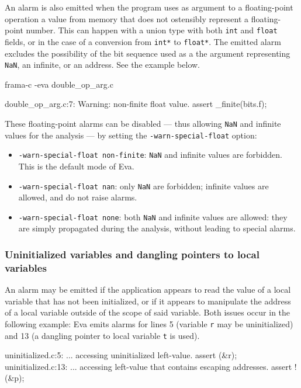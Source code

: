 \documentclass[web]{frama-c-book}
\newcommand{\Eva}{\textsf{Eva}}
\begin{document}
An alarm is also emitted when the program uses as argument to
a floating-point operation a value from memory that does not
ostensibly represent a floating-point number. This can
happen with a union type with both \lstinline|int| and
\lstinline|float| fields, or in the case of a conversion
from \lstinline|int*| to \lstinline|float*|.  The emitted alarm
excludes the possibility of the bit sequence used as a the
argument representing \lstinline|NaN|, an infinite, or an address.
See the example below.
\begin{shell}
frama-c -eva double_op_arg.c
\end{shell}
\begin{logs}
 double_op_arg.c:7: Warning: non-finite float value.
    assert \is_finite(bits.f);
\end{logs}

These floating-point alarms can be disabled — thus allowing \lstinline|NaN| and infinite
values for the analysis — by setting the \lstinline|-warn-special-float|
option:
\begin{itemize}
\item \texttt{-warn-special-float non-finite}: \lstinline|NaN| and infinite
  values are forbidden. This is the default mode of \Eva{}.
\item \texttt{-warn-special-float nan}: only \lstinline|NaN| are forbidden;
  infinite values are allowed, and do not raise alarms.
\item \texttt{-warn-special-float none}: both \lstinline|NaN| and infinite
  values are allowed: they are simply propagated during the analysis, without
  leading to special alarms.
\end{itemize}

\subsubsection{Uninitialized variables and dangling pointers to local variables}
An alarm may be emitted if the application appears to read the
value of a local variable that has not been initialized, or
if it appears to manipulate the address of a local variable outside
of the scope of said variable. Both issues occur in the following
example:
\Eva{} emits alarms for lines 5 
(variable \lstinline|r| may be uninitialized) 
and 13 (a dangling pointer to local variable \lstinline|t| is used).
\begin{logs}
uninitialized.c:5: ... accessing uninitialized left-value. assert \initialized(&r);
uninitialized.c:13: ... accessing left-value that contains escaping addresses.
                  assert !\dangling(&p);
\end{logs}
\end{document}
